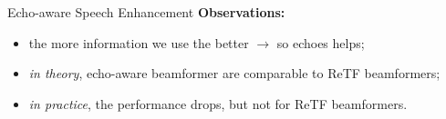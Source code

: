 \begin{frame}[t]{Echo-aware Speech Enhancement}
    \textbf{Observations:}
    \begin{itemize}
        \item the more information we use the better $\to$ so echoes helps;
        \item \textit{in theory}, echo-aware beamformer are comparable to ReTF beamformers;
        \item \textit{in practice}, the performance drops, but not for ReTF beamformers.
    \end{itemize}

\end{frame}




